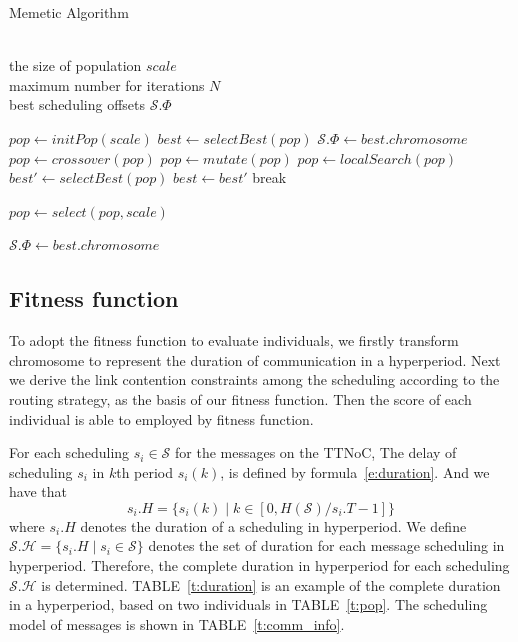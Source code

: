\documentclass[journal]{IEEEtran}
\newcommand{\calS}{\mathcal{S}}
\newcommand{\calH}{\mathcal{H}}
\theoremstyle{remark}
\begin{document}
\begin{algorithm}[tb]
\caption{Memetic Algorithm}
\renewcommand{\algorithmicrequire}{\textbf{Input:}}
\renewcommand{\algorithmicensure}{\textbf{Output:}}
\begin{algorithmic}[1]
  \REQUIRE~~\\
  the size of population $scale$\\
  maximum number for iterations $N$
  \ENSURE~~\\
  best scheduling offsets $\calS.\Phi$
  
  \STATE $pop \gets initPop(scale)$
  \STATE $best \gets selectBest(pop)$
    \RETURN $\calS.\Phi \gets best.chromosome$
  \ENDIF
    \STATE $pop \gets crossover(pop)$
    \STATE $pop \gets mutate(pop)$
    \STATE $pop \gets localSearch(pop)$
    \STATE $best' \gets selectBest(pop)$
      \STATE $best \gets best'$
    \ENDIF    
      \STATE break
    \ENDIF

    \STATE $pop \gets select(pop, scale)$
  \ENDFOR

  \RETURN $\calS.\Phi \gets best.chromosome$
\end{algorithmic}
\end{algorithm}	

\subsection{Fitness function \label{s:fit}}

To adopt the fitness function to evaluate individuals,
 we firstly transform chromosome to represent the duration of communication in a hyperperiod.
Next we derive the link contention constraints among the scheduling according to the routing strategy,
 as the basis of our fitness function.
Then the score of each individual is able to employed by fitness function.

For each scheduling $s_i \in \calS$ for the messages on the TTNoC,
 The delay of scheduling $s_i$ in $k$th period $s_i(k)$, is defined by formula~\ref{e:duration}.
And we have that
\begin{equation}
	s_i.H = \{ s_i(k) \mid k \in [ 0, H(\calS)/s_i.T - 1 ] \}
\end{equation}
where $s_i.H$ denotes the duration of a scheduling in hyperperiod.
We define 
 $ \calS.\calH = \{ s_i.H \mid s_i \in \calS \}$
 denotes the set of duration for each message scheduling in hyperperiod. 
Therefore,
 the complete duration in hyperperiod for each scheduling $ \calS.\calH $ is determined.
TABLE~\ref{t:duration} is an example of the complete duration in a hyperperiod,
 based on two individuals in TABLE~\ref{t:pop}.
The scheduling model of messages is shown in TABLE~\ref{t:comm_info}.
\end{document}
